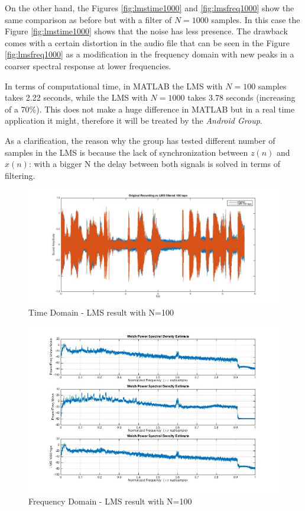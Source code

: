 \documentclass[11pt,a4paper,english]{book}  %
\theoremstyle{definition}  %
\theoremstyle{plain}  %
\theoremstyle{remark}  %
\begin{document}
	On the other hand,  the Figures \ref{fig:lmstime1000} and \ref{fig:lmsfreq1000} show the same comparison as before but with a filter of $N=1000$ samples. In this case the Figure \ref{fig:lmstime1000} shows that the noise has less presence. The drawback comes with a certain distortion in the audio file that can be seen in the Figure \ref{fig:lmsfreq1000} as a modification in the frequency domain with new peaks in a coarser spectral response at lower frequencies.
	
	In terms of computational time, in MATLAB the LMS with $N=100$ samples takes 2.22 seconds, while the LMS with $N=1000$ takes 3.78 seconds (increasing of a 70\%). This does not make a huge difference in MATLAB but in a real time application it might, therefore it will be treated by the \textit{Android Group}.
	

	As a clarification, the reason why the group has tested different number of samples in the LMS is because the lack of synchronization between $z(n)$ and $x(n)$: with a bigger N the delay between both signals is solved in terms of filtering.
	
		\begin{figure}[h]
		\centering
		\includegraphics[width=15cm]{images/theory/lms100tapstime.jpg}
		\caption{Time Domain - LMS result with N=100}
		\label{fig:lmstime100}
		\end{figure}
		
		
		\begin{figure}[h]
		\centering
		\includegraphics[width=15cm]{images/theory/lms100tapsfreq.jpg}
		\caption{Frequency Domain - LMS result with N=100}
		\label{fig:lmsfreq100}
		\end{figure}
		
\end{document}
